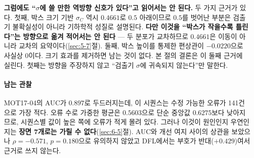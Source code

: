 \documentclass[12pt,a4paper,oneside]{report}
\begin{document}
\textbf{그럼에도 ``$\sigma$에 쓸 만한 역방향 신호가 있다''고 읽어서는 안 된다.} 두 가지 근거가 있다. 첫째, 박스 크기 기반 $\sigma_C$ 역시 $0.4661$로 $0.5$ 아래이므로 $0.5$를 벗어난 부분은 검출기 불확실성이 아니라 기하학적 성질로 설명된다. \textbf{다만 이것을 ``박스가 작을수록 틀린다''는 방향으로 옮겨 적어서는 안 된다} --- 두 분포가 교차하므로 $0.4661$은 이동이 아니라 교차의 요약이다(\ref{sec:5-7}절). 둘째, 박스 높이를 통제한 편상관이 $-0.0220$으로 사실상 0이다. 크기 효과를 제거하면 남는 것이 없다. 본 절의 결론은 이 둘째 근거에 실린다. 첫째는 방향을 주장하지 않고 ``검출기 $\sigma$에 귀속되지 않는다''만 말한다.

\paragraph{남는 관찰} MOT17-04의 AUC가 $0.897$로 두드러지는데, 이 시퀀스는 수정 가능한 오류가 141건으로 가장 적다. 오류 수로 가중한 평균은 $0.5603$으로 단순 중앙값 $0.6275$보다 낮아지므로, 시퀀스별 값이 높은 쪽에 오류가 적게 몰려 있다. 그러나 이것이 원인인지 우연인지는 \textbf{장면 7개로는 가릴 수 없다}(\ref{sec:6-5}절). AUC와 개선 여지 사이의 상관을 보았으나 $\rho = -0.571$, $p = 0.180$으로 유의하지 않았고 DFL에서는 부호가 반대($+0.429$)여서 근거로 쓰지 않는다.
\end{document}
